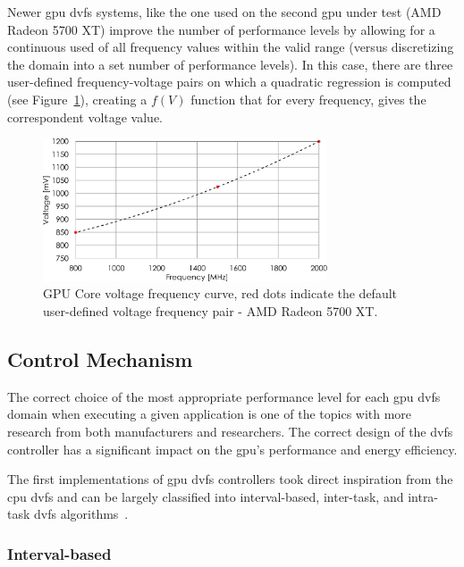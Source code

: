 Newer \acrshort{gpu} \acrshort{dvfs} systems, like the one used on the second \acrshort{gpu} under test (AMD Radeon 5700 XT) improve the number of performance levels by allowing for a continuous used of all frequency values within the valid range (versus discretizing the domain into a set number of performance levels). In this case, there are three user-defined frequency-voltage pairs on which a quadratic regression is computed  (see Figure~\ref{fig:voltage_curve}), creating a $f(V)$ function that for every frequency, gives the correspondent voltage value.

\begin{figure}[htb]
  \centering
  \includegraphics[width=0.75\textwidth]{Figures/Background/voltage_frequency_curve.pdf}
  \caption{GPU Core voltage frequency curve, red dots indicate the default user-defined voltage frequency pair - AMD Radeon 5700 XT.}
  \label{fig:voltage_curve}
\end{figure}

\subsection{Control Mechanism}

The correct choice of the most appropriate performance level for each \acrshort{gpu} \acrshort{dvfs} domain when executing a given application is one of the topics with more research from both manufacturers and researchers. The correct design of the \acrshort{dvfs} controller has a significant impact on the \acrshort{gpu}'s performance and energy efficiency.

The first implementations of \acrshort{gpu} \acrshort{dvfs} controllers took direct inspiration from the \acrshort{cpu} \acrshort{dvfs} and can be largely classified into interval-based, inter-task, and intra-task \acrshort{dvfs} algorithms~\cite{boyer_improving_2013}. 

\subsubsection{Interval-based}

